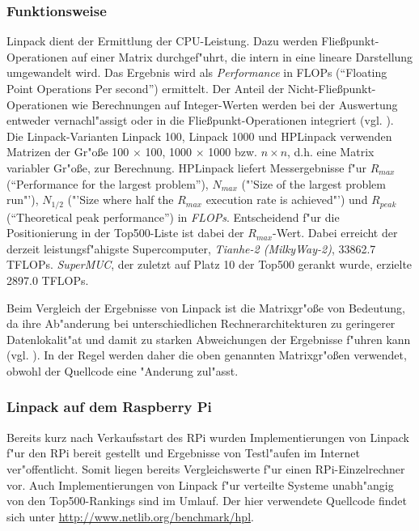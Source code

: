 
\subsubsection{Funktionsweise}\label{Funktion-Linpack}

Linpack dient der Ermittlung der CPU-Leistung. Dazu werden Flie\ss punkt-Operationen auf einer Matrix durchgef"uhrt, die intern in eine lineare Darstellung umgewandelt wird. Das Ergebnis wird als \textit{Performance} in FLOPs ("`Floating Point Operations Per second"') ermittelt. Der Anteil der Nicht-Flie\ss punkt-Operationen wie Berechnungen auf Integer-Werten werden bei der Auswertung entweder vernachl"assigt oder in die Flie\ss punkt-Operationen integriert (vgl. \cite{wei90}). Die Linpack-Varianten Linpack 100, Linpack 1000 und HPLinpack verwenden Matrizen der Gr"o\ss e 100 $\times$ 100, 1000 $\times$ 1000 bzw. $n\times n$, d.h. eine Matrix variabler Gr"o\ss e, zur Berechnung. HPLinpack liefert Messergebnisse f"ur $R_{max}$ ("`Performance for the largest problem"'), $N_{max}$ ("'Size of the largest problem run"'), $N_{1/2}$ ("'Size where half the $R_{max}$ execution rate is achieved"') und $R_{peak}$ ("`Theoretical peak performance"') in \textit{FLOPs}. Entscheidend f"ur die Positionierung in der Top500-Liste ist dabei der $R_{max}$-Wert. Dabei erreicht der derzeit leistungsf"ahigste Supercomputer, \textit{Tianhe-2 (Milky\-Way-2)}, 33862.7 TFLOPs. \textit{SuperMUC}, der zuletzt auf Platz 10 der Top500 gerankt wurde, erzielte 2897.0 TFLOPs.

Beim Vergleich der Ergebnisse von Linpack ist die Matrixgr"o\ss e von Bedeutung, da ihre Ab"anderung bei unterschiedlichen Rechnerarchitekturen zu geringerer Datenlokalit"at und damit zu starken Abweichungen der Ergebnisse f"uhren kann (vgl. \cite{wei90}). In der Regel werden daher die oben genannten Matrixgr"o\ss en verwendet, obwohl der Quellcode eine "Anderung zul"asst. 

\subsubsection{Linpack auf dem Raspberry Pi}\label{Linpack-RPi}

Bereits kurz nach Verkaufsstart des RPi wurden Implementierungen von Linpack f"ur den RPi bereit gestellt und Ergebnisse von Testl"aufen im Internet ver"offentlicht. Somit liegen bereits Vergleichswerte f"ur einen RPi-Einzelrechner vor. Auch Implementierungen von Linpack f"ur verteilte Systeme unabh"angig von den Top500-Rankings sind im Umlauf. Der hier verwendete Quellcode findet sich unter \url{http://www.netlib.org/benchmark/hpl}. 

